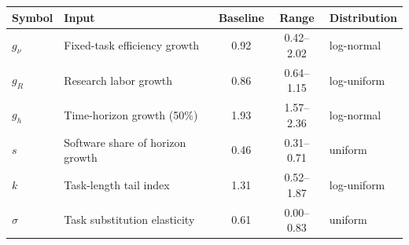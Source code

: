 \begin{tabular}{@{}llccl@{}}
\toprule
Symbol & Input & Baseline & Range & Distribution \\
\midrule
$g_\nu$ & Fixed-task efficiency growth & 0.92 & 0.42--2.02 & log-normal \\
$g_R$ & Research labor growth & 0.86 & 0.64--1.15 & log-uniform \\
$g_h$ & Time-horizon growth (50\%) & 1.93 & 1.57--2.36 & log-normal \\
$s$ & Software share of horizon growth & 0.46 & 0.31--0.71 & uniform \\
$k$ & Task-length tail index & 1.31 & 0.52--1.87 & log-uniform \\
$\sigma$ & Task substitution elasticity & 0.61 & 0.00--0.83 & uniform \\
\bottomrule
\end{tabular}
